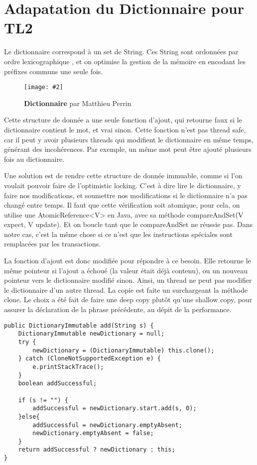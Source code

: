 \documentclass[10pt, a4paper]{article}
\newcommand{\figuremacro}[5]{
    \begin{figure}[#1]
        \centering
        \texttt{[image: \#2]}
        \caption[#3]{\textbf{#3}#4}
        \label{fig:#2}
    \end{figure}
}
\begin{document}
\section{Adapatation du Dictionnaire pour TL2}
Le dictionnaire correspond à un set de String. Ces String sont ordonnées par ordre lexicographique , et on optimise la gestion de la mémoire en encodant les préfixes communs une seule fois.

\figuremacro{h}{dico}{Dictionnaire}{ par Matthieu Perrin}{1.0}

Cette structure de donnée a une seule fonction d'ajout, qui retourne faux si le dictionnaire contient le mot, et vrai sinon. Cette fonction n'est pas thread safe, car il peut y avoir plusieurs threads qui modifient le dictionnaire en même temps, générant des incohérences. Par exemple, un même mot peut être ajouté plusieurs fois au dictionnaire.

Une solution est de rendre cette structure de donnée immuable, comme si l'on voulait pouvoir faire de l'optimistic locking. C'est à dire lire le dictionnaire, y faire nos modifications, et soumettre nos modifications si le dictionnaire n'a pas changé entre temps. Il faut que cette vérification soit atomique, pour cela, on utilise une AtomicReference<V> en Java, avec sa méthode compareAndSet(V expect, V update). Et on boucle tant que le compareAndSet ne réussie pas. Dans notre cas, c'est la même chose si ce n'est que les instructions spéciales sont remplacées par les transactions.

La fonction d'ajout est donc modifiée pour répondre à ce besoin. Elle retourne le même pointeur si l'ajout a échoué (la valeur était déjà contenu), ou un nouveau pointeur vers le dictionnaire modifié sinon. Ainsi, un thread ne peut pas modifier le dictionnaire d'un autre thread. La copie est faite un surchargeant la méthode clone. Le choix a été fait de faire une deep copy plutôt qu'une shallow copy, pour assurer la déclaration de la phrase précédente, au dépit de la performance.
\begin{lstlisting}
public DictionaryImmutable add(String s) {
    DictionaryImmutable newDictionary = null;
    try {
        newDictionary = (DictionaryImmutable) this.clone();
    } catch (CloneNotSupportedException e) {
        e.printStackTrace();
    }
    boolean addSuccessful;

    if (s != "") {
        addSuccessful = newDictionary.start.add(s, 0);
    }else{
        addSuccessful = newDictionary.emptyAbsent;
        newDictionary.emptyAbsent = false;
    }
    return addSuccessful ? newDictionary : this;
}
\end{lstlisting}
\end{document}
